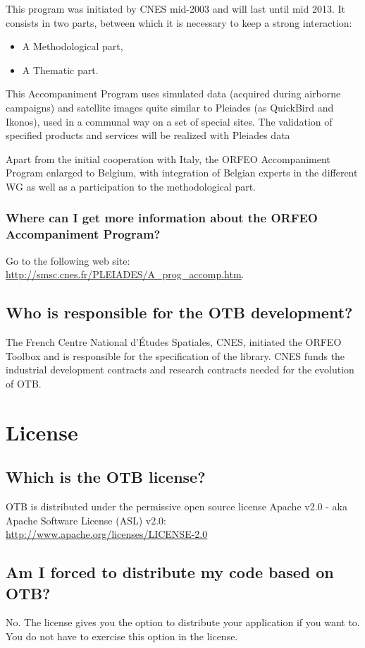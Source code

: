 This program was initiated by CNES mid-2003 and will last until mid 2013.
It consists in two parts, between which it is necessary to keep a strong interaction:
\begin{itemize}
\item A Methodological part,
\item A Thematic part.
\end{itemize}

This Accompaniment Program uses simulated data (acquired during airborne campaigns) and satellite images quite similar to Pleiades (as QuickBird and Ikonos), used in a communal way on a set of special sites. The validation of specified products and services will be realized with Pleiades data

Apart from the initial cooperation with Italy, the ORFEO Accompaniment
Program enlarged to Belgium, with integration of Belgian experts in
the different WG as well as a participation to the methodological
part.

\subsubsection{Where can I get more information about the ORFEO
  Accompaniment Program?}
Go to the following web site:
\url{http://smsc.cnes.fr/PLEIADES/A_prog_accomp.htm}.

\subsection{Who is responsible for the OTB development?}
The French Centre National d'\'Etudes Spatiales, CNES, initiated the ORFEO
Toolbox and is responsible for the specification of the library. CNES
funds the industrial development contracts and research contracts
needed for the evolution of OTB.

\section{License}
\subsection{Which is the OTB license?}
OTB is distributed under the permissive open source license Apache v2.0 - aka
Apache Software License (ASL) v2.0:\\
\url{http://www.apache.org/licenses/LICENSE-2.0}

\subsection{Am I forced to distribute my code based on OTB?}
No. The license gives you the option to distribute your application if
you want to. You do not have to exercise this option in the license.

